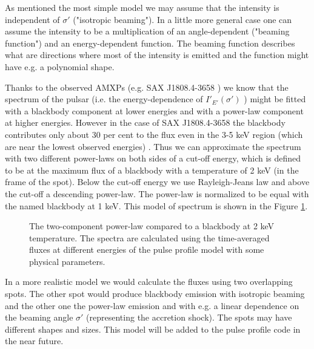 \documentclass{wihuri}
\def\Dop{\delta}
\begin{document}

As mentioned the most simple model we may assume that the intensity is independent of $\sigma'$ ("isotropic beaming"). In a little more general case one can assume the intensity to be a multiplication of an angle-dependent ("beaming function") and an energy-dependent function. The beaming function describes what are directions where most of the intensity is emitted and the function might have e.g. a polynomial shape.  


Thanks to the observed AMXPs (e.g. SAX J1808.4-3658 \cite{poutagierlinskisax}) we know that the spectrum of the pulsar (i.e. the energy-dependence of $I'_{E'}(\sigma')$ ) might be fitted with a blackbody component at lower energies and with a power-law component at higher energies. However in the case of SAX J1808.4-3658 the blackbody contributes only about 30 per cent to the flux even in the 3-5 keV region (which are near the lowest observed energies) \cite{poutagierlinskisax}. Thus we can approximate the spectrum with two different power-laws on both sides of a cut-off energy, which is defined to be at the maximum flux of a blackbody with a temperature of 2 keV (in the frame of the spot). Below the cut-off energy we use Rayleigh-Jeans law and above the cut-off a descending power-law. The power-law is normalized to be equal with the named blackbody at 1 keV. This model of spectrum is shown in the Figure \ref{fig:spectrum}.


\begin{figure}
\centerline{}
\caption{The two-component power-law compared to a blackbody at 2 keV temperature. The spectra are calculated using the time-averaged fluxes at different energies of the pulse profile model with some physical parameters. 
\label{fig:spectrum}}
\end{figure}


In a more realistic model we would calculate the fluxes using two overlapping spots. The other spot would produce blackbody emission with isotropic beaming and the other one the power-law emission and with e.g. a linear dependence on the beaming angle $\sigma'$ (representing the accretion shock). The spots may have different shapes and sizes. This model will be added to the pulse profile code in the near future.
\end{document}
